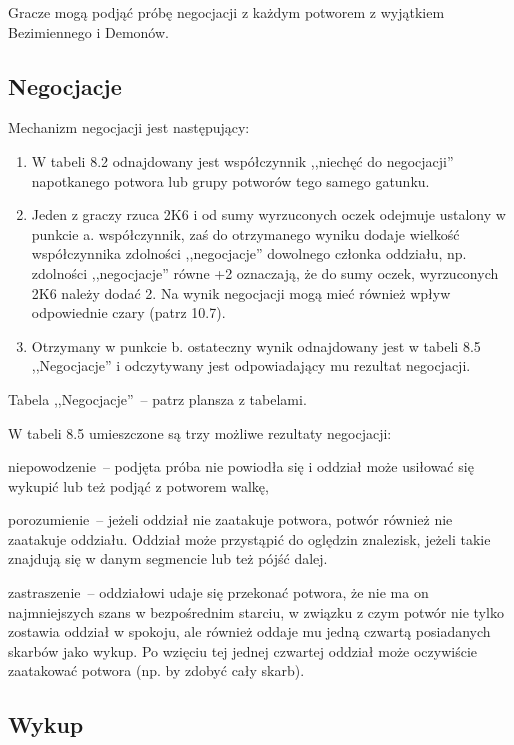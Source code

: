 Gracze mogą podjąć próbę negocjacji z każdym potworem z wyjątkiem Bezimiennego i Demonów.

\subsection{Negocjacje}

Mechanizm negocjacji jest następujący:

\begin{enumerate}
    \item
        W tabeli 8.2 odnajdowany jest współczynnik ,,niechęć do negocjacji'' napotkanego potwora lub grupy potworów tego samego gatunku.
    \item
        Jeden z graczy rzuca 2K6 i od sumy wyrzuconych oczek odejmuje ustalony w punkcie a. współczynnik, zaś do otrzymanego wyniku dodaje wielkość współczynnika zdolności ,,negocjacje'' dowolnego członka oddziału, np. zdolności ,,negocjacje'' równe +2 oznaczają, że do sumy oczek, wyrzuconych 2K6 należy dodać 2.
        Na wynik negocjacji mogą mieć również wpływ odpowiednie czary (patrz 10.7).
    \item
        Otrzymany w punkcie b. ostateczny wynik odnajdowany jest w tabeli 8.5 ,,Negocjacje'' i odczytywany jest odpowiadający mu rezultat negocjacji.
\end{enumerate}

Tabela ,,Negocjacje''~-- patrz plansza z tabelami.

W tabeli 8.5 umieszczone są trzy możliwe rezultaty negocjacji:

niepowodzenie~-- podjęta próba nie powiodła się i oddział może usiłować się wykupić lub też podjąć z potworem walkę,

porozumienie~-- jeżeli oddział nie zaatakuje potwora, potwór również nie zaatakuje oddziału.
Oddział może przystąpić do oględzin znalezisk, jeżeli takie znajdują się w danym segmencie lub też pójść dalej.

zastraszenie~-- oddziałowi udaje się przekonać potwora, że nie ma on najmniejszych szans w bezpośrednim starciu, w związku z czym potwór nie tylko zostawia oddział w spokoju, ale również oddaje mu jedną czwartą posiadanych skarbów jako wykup.
Po wzięciu tej jednej czwartej oddział może oczywiście zaatakować potwora (np. by zdobyć cały skarb).

\subsection{Wykup}

